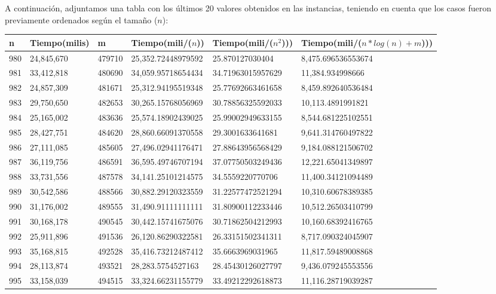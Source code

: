 A continuación, adjuntamos una tabla con los últimos 20 valores obtenidos en las instancias, teniendo en cuenta que los casos fueron previamente ordenados según el tamaño ($n$):

\begin{table}[H]
\parbox{0.3\textwidth}{
    \begin{tabular}{ | l | l | l | l | l | l |}
    \hline
n   &Tiempo(milis) &m &Tiempo(mili/($n$)) &Tiempo(mili/($n^2$))) &Tiempo(mili/($n*log(n) + m$)))\\ \hline
980	&24,845,670	&479710	&25,352.72448979592	&25.870127030404	&8,475.696536553674\\ \hline
981	&33,412,818	&480690	&34,059.95718654434	&34.71963015957629	&11,384.934998666\\ \hline
982	&24,857,309	&481671	&25,312.94195519348	&25.77692663461658	&8,459.892640536484\\ \hline
983	&29,750,650	&482653	&30,265.15768056969	&30.78856325592033	&10,113.4891991821\\ \hline
984	&25,165,002	&483636	&25,574.18902439025	&25.99002949633155	&8,544.681225102551\\ \hline
985	&28,427,751	&484620	&28,860.66091370558	&29.3001633641681	&9,641.314760497822\\ \hline
986	&27,111,085	&485605	&27,496.02941176471	&27.88643956568429	&9,184.088121506702\\ \hline
987	&36,119,756	&486591	&36,595.49746707194	&37.07750503249436	&12,221.65041349897\\ \hline
988	&33,731,556	&487578	&34,141.25101214575	&34.5559220770706	&11,400.34121094489\\ \hline
989	&30,542,586	&488566	&30,882.29120323559	&31.22577472521294	&10,310.60678389385\\ \hline
990	&31,176,002	&489555	&31,490.91111111111	&31.80900112233446	&10,512.26503410799\\ \hline
991	&30,168,178	&490545	&30,442.15741675076	&30.71862504212993	&10,160.68392416765\\ \hline
992	&25,911,896	&491536	&26,120.86290322581	&26.33151502341311	&8,717.090324045907\\ \hline
993	&35,168,815	&492528	&35,416.73212487412	&35.6663969031965	&11,817.59489008868\\ \hline
994	&28,113,874	&493521	&28,283.5754527163	&28.45430126027797	&9,436.079245553556\\ \hline
995	&33,158,039	&494515	&33,324.66231155779	&33.49212292618873	&11,116.28719039287\\ \hline

\end{tabular}}
\end{table}
